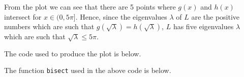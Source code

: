 \begin{solution}
\begin{enumerate}
From the plot we can see that there are 5 points where $g(x)$ and $h(x)$ intersect for $x\in(0,5\pi]$. Hence, since the eigenvalues $\lambda$ of $L$ are the positive numbers which are such that $g(\sqrt{\lambda})=h(\sqrt{\lambda})$, $L$ has five eigenvalues $\lambda$ which are such that $\sqrt{\lambda}\le 5\pi$.

The code used to produce the plot is below.



The  function \verb|bisect| used in the above code is below.



\end{enumerate} 
\end{solution}